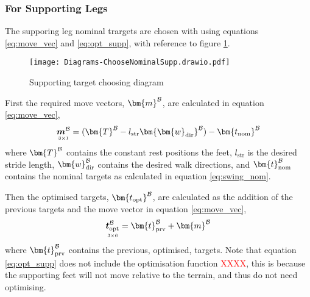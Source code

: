             \subsubsection{For Supporting Legs} \label{sec:support}
                The supporing leg nominal trargets are chosen with using equations \ref{eq:move_vec} and \ref{eq:opt_supp}, with reference
                to figure \ref{fig:supp_targ}.
                \begin{figure}[h]
                    \centering
                    \texttt{[image: Diagrams-ChooseNominalSupp.drawio.pdf]}
                    \caption{Supporting target choosing diagram} 
                    \label{fig:supp_targ}
                \end{figure}

                \noindent
                First the required move vectors, \(\bm{m} ^\fbody\), are calculated in equation \ref{eq:move_vec},
                \begin{equation}\label{eq:move_vec}
                    \mdim{\boldsymbol{m}^\fbody}{3}{1} =  (\bm{T}^\fbody - l_\text{str} \bm{\bm{w}_\text{dir}}^\fbody) - \bm{t_\text{nom}}^\fbody
                \end{equation}
                where \(\bm{T}^\fbody\) contains the constant rest positions the feet, \(l_\text{str}\) is the desired stride length, \(\bm{w}_\text{dir}^\fbody\)
                contains the desired walk directions, and \(\bm{t}_\text{nom} ^\fbody\) contains the nominal targets as calculated in
                equation \ref{eq:swing_nom}.

                Then the optimised targets, \(\bm{t_\text{opt}} ^\fbody\), are calculated as the addition of the previous targets and the move vector in equation \ref{eq:move_vec},
                \begin{equation} \label{eq:opt_supp}
                    \mdim{\boldsymbol{t}_\text{opt}^\fbody}{3}{6} = \bm{t}_\text{prv}^\fbody + \bm{m}^\fbody
                \end{equation}
                where \(\bm{t}_\text{prv}^\fbody\) contains the previous, optimised, targets. Note that equation \ref{eq:opt_supp} does not include the optimisation
                function \textcolor{red}{XXXX}, this is because the supporting feet will not move relative to the terrain, and thus do not need optimising.

            \newpage
